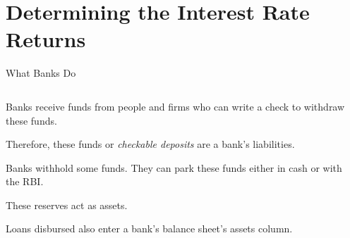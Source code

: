 \documentclass[shownotes,11pt, aspectratio=169]{beamer}
\newenvironment{wideitemize}{\itemize\addtolength{\itemsep}{10pt}}{\enditemize}
\begin{document}
\section{Determining the Interest Rate Returns}
\begin{frame}{What Banks Do}
\begin{columns}[T] %
\begin{column}{.52\textwidth}
  \begin{wideitemize}
    \item Banks receive funds from people and firms who can write a check to withdraw these funds.
    \item Therefore, these funds or \textit{checkable deposits} are a bank's \textcolor{red!90}{liabilities}.
    \pause
    \item Banks withhold some funds. They can park these funds either in cash or with the RBI.
    \item These reserves act as \textcolor{red!90}{assets}.
    \pause
    \item Loans disbursed also enter a bank's balance sheet's assets column.
  \end{wideitemize}
\end{column}%
\pause
\hfill%
\begin{column}{.44\textwidth}
\end{column}%
\end{columns}
\end{frame}
\end{document}
